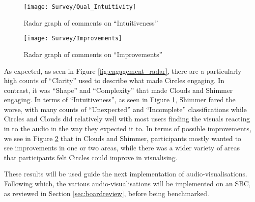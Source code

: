 \documentclass[../initial_thesis.tex]{subfiles}
\begin{document}
\begin{figure}
  \texttt{[image: Survey/Qual\_Intuitivity]}
  \caption{Radar graph of comments on ``Intuitiveness''}
  \label{fig:intuitive_radar}
\end{figure}

\begin{figure}
  \texttt{[image: Survey/Improvements]}
  \caption{Radar graph of comments on ``Improvements''}
  \label{fig:improvement_radar}
\end{figure}

As expected, as seen in Figure \ref{fig:engagement_radar}, there are a particularly high counts of ``Clarity'' used to describe what made Circles engaging. In contrast, it was ``Shape'' and ``Complexity'' that made Clouds and Shimmer engaging. In terms of ``Intuitiveness'', as seen in Figure \ref{fig:intuitive_radar}, Shimmer fared the worse, with many counts of ``Unexpected'' and ``Incomplete'' classifications while Circles and Clouds did relatively well with most users finding the visuals reacting in to the audio in the way they expected it to. In terms of possible improvements, we see in Figure \ref{fig:improvement_radar} that in Clouds and Shimmer, participants mostly wanted to see improvements in one or two areas, while there was a wider variety of areas that participants felt Circles could improve in visualising.\par

These results will be used guide the next implementation of audio-visualisations. Following which, the various audio-visualisations will be implemented on an SBC, as reviewed in Section \ref{sec:boardreview}, before being benchmarked. 
\end{document}
